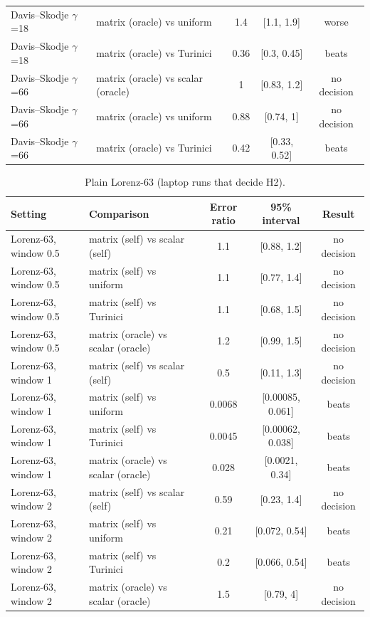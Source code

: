 \begin{table}[H]
\begin{tabular}{llccc}
Davis--Skodje $\gamma$=18 & matrix (oracle) vs uniform & 1.4 & [1.1, 1.9] & worse\\
Davis--Skodje $\gamma$=18 & matrix (oracle) vs Turinici & 0.36 & [0.3, 0.45] & beats\\
Davis--Skodje $\gamma$=66 & matrix (oracle) vs scalar (oracle) & 1 & [0.83, 1.2] & no decision\\
Davis--Skodje $\gamma$=66 & matrix (oracle) vs uniform & 0.88 & [0.74, 1] & no decision\\
Davis--Skodje $\gamma$=66 & matrix (oracle) vs Turinici & 0.42 & [0.33, 0.52] & beats\\
\bottomrule\end{tabular}\end{table}

\begin{table}[H]\centering\small
\caption{Plain Lorenz-63 (laptop runs that decide H2).}
\begin{tabular}{llccc}\toprule
Setting & Comparison & Error ratio & 95\% interval & Result\\\midrule
Lorenz-63, window 0.5 & matrix (self) vs scalar (self) & 1.1 & [0.88, 1.2] & no decision\\
Lorenz-63, window 0.5 & matrix (self) vs uniform & 1.1 & [0.77, 1.4] & no decision\\
Lorenz-63, window 0.5 & matrix (self) vs Turinici & 1.1 & [0.68, 1.5] & no decision\\
Lorenz-63, window 0.5 & matrix (oracle) vs scalar (oracle) & 1.2 & [0.99, 1.5] & no decision\\
Lorenz-63, window 1 & matrix (self) vs scalar (self) & 0.5 & [0.11, 1.3] & no decision\\
Lorenz-63, window 1 & matrix (self) vs uniform & 0.0068 & [0.00085, 0.061] & beats\\
Lorenz-63, window 1 & matrix (self) vs Turinici & 0.0045 & [0.00062, 0.038] & beats\\
Lorenz-63, window 1 & matrix (oracle) vs scalar (oracle) & 0.028 & [0.0021, 0.34] & beats\\
Lorenz-63, window 2 & matrix (self) vs scalar (self) & 0.59 & [0.23, 1.4] & no decision\\
Lorenz-63, window 2 & matrix (self) vs uniform & 0.21 & [0.072, 0.54] & beats\\
Lorenz-63, window 2 & matrix (self) vs Turinici & 0.2 & [0.066, 0.54] & beats\\
Lorenz-63, window 2 & matrix (oracle) vs scalar (oracle) & 1.5 & [0.79, 4] & no decision\\
\bottomrule\end{tabular}\end{table}

